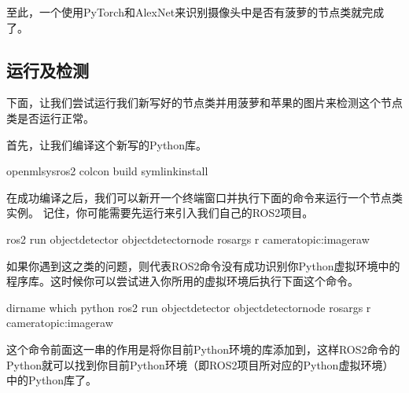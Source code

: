 \documentclass[letterpaper,10pt,english]{sphinxmanual}
\begin{document}
\sphinxAtStartPar
至此，一个使用PyTorch和AlexNet来识别摄像头中是否有菠萝的节点类就完成了。


\subsection{运行及检测}
\label{\detokenize{chapter_rl_sys/perception_code_ex:id5}}
\sphinxAtStartPar
下面，让我们尝试运行我们新写好的节点类并用菠萝和苹果的图片来检测这个节点类是否运行正常。

\sphinxAtStartPar
首先，让我们编译这个新写的Python库。

\begin{sphinxVerbatim}[commandchars=\\\{\}]
 openmlsys\PYGZhy{}ros2
colcon build \PYGZhy{}\PYGZhy{}symlink\PYGZhy{}install
\end{sphinxVerbatim}

\sphinxAtStartPar
在成功编译之后，我们可以新开一个终端窗口并执行下面的命令来运行一个节点类实例。
记住，你可能需要先运行来引入我们自己的ROS2项目。

\begin{sphinxVerbatim}[commandchars=\\\{\}]
ros2 run object\PYGZus{}detector object\PYGZus{}detector\PYGZus{}node \PYGZhy{}\PYGZhy{}ros\PYGZhy{}args \PYGZhy{}r camera\PYGZus{}topic:image\PYGZus{}raw
\end{sphinxVerbatim}

\sphinxAtStartPar
如果你遇到这之类的问题，则代表ROS2命令没有成功识别你Python虚拟环境中的程序库。这时候你可以尝试进入你所用的虚拟环境后执行下面这个命令。

\begin{sphinxVerbatim}[commandchars=\\\{\}]
dirname which python ros2 run object\PYGZus{}detector object\PYGZus{}detector\PYGZus{}node \PYGZhy{}\PYGZhy{}ros\PYGZhy{}args \PYGZhy{}r camera\PYGZus{}topic:image\PYGZus{}raw
\end{sphinxVerbatim}

\sphinxAtStartPar
这个命令前面这一串的作用是将你目前Python环境的库添加到，这样ROS2命令的Python就可以找到你目前Python环境（即ROS2项目所对应的Python虚拟环境）中的Python库了。
\end{document}
